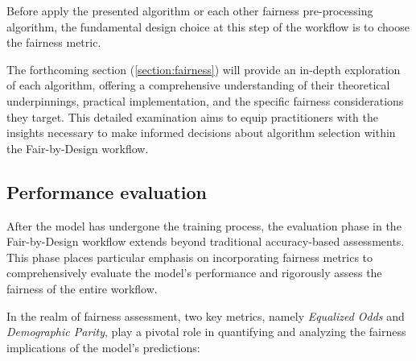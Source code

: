 \documentclass[12pt,a4paper,openright,twoside]{book}
\begin{document}
Before apply the presented algorithm or each other fairness pre-processing algorithm, the fundamental design choice at this step of the workflow is to choose the fairness metric.

The forthcoming section (\cref{section:fairness}) will provide an in-depth exploration of each algorithm, offering a comprehensive understanding of their theoretical underpinnings, practical implementation, and the specific fairness considerations they target. This detailed examination aims to equip practitioners with the insights necessary to make informed decisions about algorithm selection within the Fair-by-Design workflow.

\subsection{Performance evaluation}

After the model has undergone the training process, the evaluation phase in the Fair-by-Design workflow extends beyond traditional accuracy-based assessments. This phase places particular emphasis on incorporating fairness metrics to comprehensively evaluate the model's performance and rigorously assess the fairness of the entire workflow.

In the realm of fairness assessment, two key metrics, namely \emph{Equalized Odds} and \emph{Demographic Parity}, play a pivotal role in quantifying and analyzing the fairness implications of the model's predictions:
\end{document}

